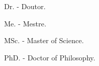 \begin{abreviaturas}

    Dr. - Doutor.

    Me. - Mestre.

    MSc. - Master of Science.

    PhD. - Doctor of Philosophy. 

\end{abreviaturas}